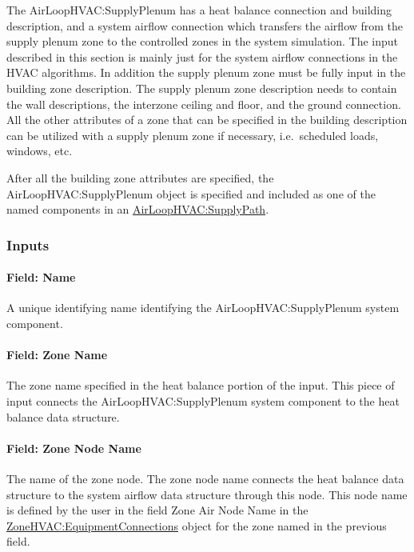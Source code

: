 The AirLoopHVAC:SupplyPlenum has a heat balance connection and building description, and a system airflow connection which transfers the airflow from the supply plenum zone to the controlled zones in the system simulation. The input described in this section is mainly just for the system airflow connections in the HVAC algorithms. In addition the supply plenum zone must be fully input in the building zone description. The supply plenum zone description needs to contain the wall descriptions, the interzone ceiling and floor, and the ground connection. All the other attributes of a zone that can be specified in the building description can be utilized with a supply plenum zone if necessary, i.e.~scheduled loads, windows, etc.

After all the building zone attributes are specified, the AirLoopHVAC:SupplyPlenum object is specified and included as one of the named components in an \hyperref[airloophvacsupplypath]{AirLoopHVAC:SupplyPath}.

\subsubsection{Inputs}\label{inputs-3-002}

\paragraph{Field: Name}\label{field-name-3-002}

A unique identifying name identifying the AirLoopHVAC:SupplyPlenum system component.

\paragraph{Field: Zone Name}\label{field-zone-name-1}

The zone name specified in the heat balance portion of the input. This piece of input connects the AirLoopHVAC:SupplyPlenum system component to the heat balance data structure.

\paragraph{Field: Zone Node Name}\label{field-zone-node-name-1}

The name of the zone node. The zone node name connects the heat balance data structure to the system airflow data structure through this node. This node name is defined by the user in the field Zone Air Node Name in the \hyperref[zonehvacequipmentconnections]{ZoneHVAC:EquipmentConnections} object for the zone named in the previous field.

